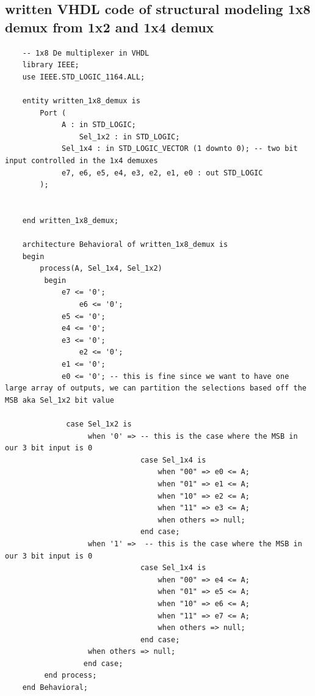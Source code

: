 \documentclass[12pt]{article}
\begin{document}
\subsection{written VHDL code of structural modeling 1x8 demux from 1x2 and 1x4 demux}
\begin{verbatim}
    -- 1x8 De multiplexer in VHDL
    library IEEE; 
    use IEEE.STD_LOGIC_1164.ALL;
    
    entity written_1x8_demux is
    	Port (
    	     A : in STD_LOGIC;
                 Sel_1x2 : in STD_LOGIC;
    	     Sel_1x4 : in STD_LOGIC_VECTOR (1 downto 0); -- two bit input controlled in the 1x4 demuxes
    	     e7, e6, e5, e4, e3, e2, e1, e0 : out STD_LOGIC
    	);
    	
    	
    end written_1x8_demux;
    
    architecture Behavioral of written_1x8_demux is
    begin
        process(A, Sel_1x4, Sel_1x2)
    	 begin
    	     e7 <= '0';
                 e6 <= '0';
    	     e5 <= '0';
    	     e4 <= '0';
    	     e3 <= '0'; 
                 e2 <= '0';
    	     e1 <= '0';
    	     e0 <= '0'; -- this is fine since we want to have one large array of outputs, we can partition the selections based off the MSB aka Sel_1x2 bit value
    		  
    		  case Sel_1x2 is
    		       when '0' => -- this is the case where the MSB in our 3 bit input is 0
                               case Sel_1x4 is
                                   when "00" => e0 <= A;
                                   when "01" => e1 <= A;
                                   when "10" => e2 <= A;
                                   when "11" => e3 <= A;
                                   when others => null;
                               end case;
    		       when '1' =>  -- this is the case where the MSB in our 3 bit input is 0
                               case Sel_1x4 is
                                   when "00" => e4 <= A;
                                   when "01" => e5 <= A;
                                   when "10" => e6 <= A;
                                   when "11" => e7 <= A;
                                   when others => null;
                               end case;
    		       when others => null;
    	          end case;
    	 end process;
    end Behavioral;
\end{verbatim}
\end{document}
